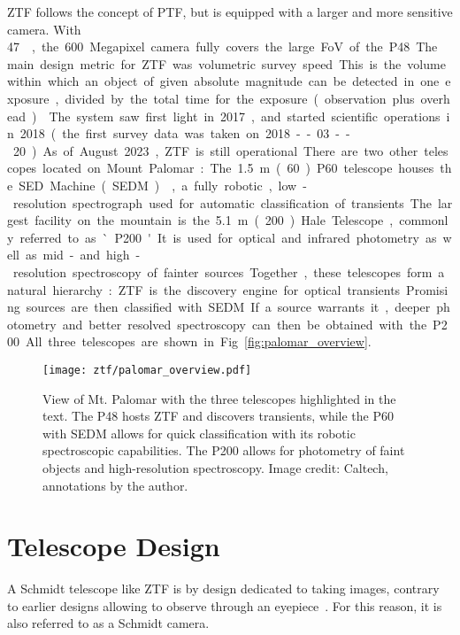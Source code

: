 ZTF follows the concept of PTF, but is equipped with a larger and more sensitive camera. With \SI{47}{\square\deg}, the 600 Megapixel camera fully covers the large FoV of the P48. The main design metric for ZTF was volumetric survey speed. This is the volume within which an object of given absolute magnitude can be detected in one exposure, divided by the total time for the exposure (observation plus overhead)~. The system saw first light in 2017, and started scientific operations in 2018 (the first survey data was taken on 2018--03--20). As of August 2023, ZTF is still operational.

There are two other telescopes located on Mount Palomar: The \SI{1.5}{\meter} (\SI{60}{\inch}) P60 telescope houses the SED Machine (SEDM)~, a fully robotic, low-resolution spectrograph used for automatic classification of transients. The largest facility on the mountain is the \SI{5.1}{\meter} (\SI{200}{\inch}) Hale Telescope, commonly referred to as `P200'. It is used for optical and infrared photometry as well as mid- and high-resolution spectroscopy of fainter sources. Together, these telescopes form a natural hierarchy: ZTF is the discovery engine for optical transients. Promising sources are then classified with SEDM. If a source warrants it, deeper photometry and better resolved spectroscopy can then be obtained with the P200. All three telescopes are shown in Fig.~\ref{fig:palomar_overview}.

\begin{figure*}[]
    \texttt{[image: ztf/palomar\_overview.pdf]}
    \caption[View of Mt. Palomar]{View of Mt. Palomar with the three telescopes highlighted in the text. The P48 hosts ZTF and discovers transients, while the P60 with SEDM allows for quick classification with its robotic spectroscopic capabilities. The P200 allows for photometry of faint objects and high-resolution spectroscopy. Image credit: Caltech, annotations by the author.}
\end{figure*}

\section{Telescope Design}\label{telescope_design}
A Schmidt telescope like ZTF is by design dedicated to taking images, contrary to earlier designs allowing to observe through an eyepiece~. For this reason, it is also referred to as a Schmidt camera.

